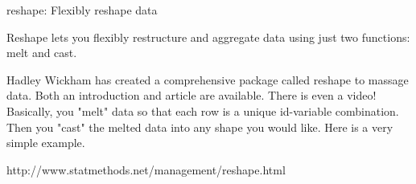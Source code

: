 reshape: Flexibly reshape data

Reshape lets you flexibly restructure and aggregate data using just two functions: melt and cast.

Hadley Wickham has created a comprehensive package called reshape to massage data. Both an introduction and article are available. There is even a video!
Basically, you "melt" data so that each row is a unique id-variable combination. Then you "cast" the melted data into any shape you would like. Here is a very simple example.

http://www.statmethods.net/management/reshape.html


